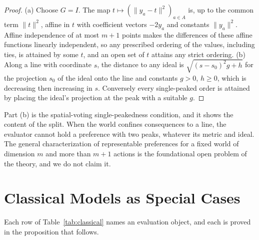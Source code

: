 \documentclass[11pt]{article}
\theoremstyle{definition}
\theoremstyle{remark}
\begin{document}
\begin{proof}
(a) Choose $G=I$. The map $t\mapsto(\|y_{a}-t\|^{2})_{a\in A}$ is, up to the common term $\|t\|^{2}$, affine in $t$ with coefficient vectors $-2y_{a}$ and constants $\|y_{a}\|^{2}$. Affine independence of at most $m+1$ points makes the differences of these affine functions linearly independent, so any prescribed ordering of the values, including ties, is attained by some $t$, and an open set of $t$ attains any strict ordering.
(b) Along a line with coordinate $s$, the distance to any ideal is $\sqrt{(s-s_{0})^{2}g+h}$ for the projection $s_{0}$ of the ideal onto the line and constants $g>0$, $h\ge0$, which is decreasing then increasing in $s$. Conversely every single-peaked order is attained by placing the ideal's projection at the peak with a suitable $g$.
\end{proof}

Part (b) is the spatial-voting single-peakedness condition, and it shows the content of the split.
When the world confines consequences to a line, the evaluator cannot hold a preference with two peaks, whatever its metric and ideal.
The general characterization of representable preferences for a fixed world of dimension $m$ and more than $m+1$ actions is the foundational open problem of the theory, and we do not claim it.

\section{Classical Models as Special Cases}
\label{sec:classical}

Each row of Table~\ref{tab:classical} names an evaluation object, and each is proved in the proposition that follows.
\end{document}
